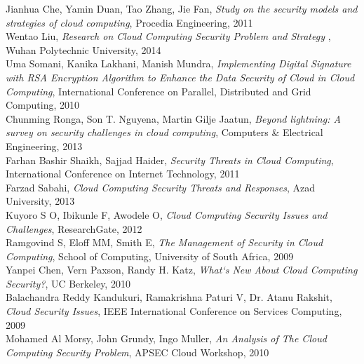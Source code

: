 \documentclass[a4paper, 8pt]{article} %
\begin{document}
\begin{itemize}
\end{itemize}

\newpage

\begin{thebibliography}{1}
Jianhua Che, Yamin Duan, Tao Zhang, Jie Fan, \emph{Study on the security models and strategies of cloud computing}, \relax Procedia Engineering, 2011\\
Wentao Liu, \emph{Research on Cloud Computing Security Problem and Strategy }, \relax Wuhan Polytechnic University, 2014\\
Uma Somani, Kanika Lakhani, Manish Mundra, \emph{Implementing Digital Signature with RSA Encryption Algorithm to Enhance the Data Security of Cloud in Cloud Computing}, \relax International Conference on Parallel, Distributed and Grid Computing, 2010\\
Chunming Ronga, Son T. Nguyena, Martin Gilje Jaatun, \emph{Beyond lightning: A survey on security challenges in cloud computing}, \relax Computers \& Electrical Engineering, 2013\\
Farhan Bashir Shaikh, Sajjad Haider, \emph{Security Threats in Cloud Computing}, \relax International Conference on Internet Technology, 2011\\
Farzad Sabahi, \emph{Cloud Computing Security Threats and Responses}, \relax Azad University, 2013\\
Kuyoro S O, Ibikunle F, Awodele O, \emph{Cloud Computing Security Issues and Challenges}, \relax ResearchGate, 2012\\
Ramgovind S, Eloff MM, Smith E, \emph{The Management of Security in Cloud Computing}, \relax School of Computing, University of South Africa, 2009\\
Yanpei Chen, Vern Paxson, Randy H. Katz, \emph{What`s New About Cloud Computing Security?}, \relax UC Berkeley, 2010\\
Balachandra Reddy Kandukuri, Ramakrishna Paturi V, Dr. Atanu Rakshit, \emph{Cloud Security Issues}, \relax IEEE International Conference on Services Computing, 2009\\
Mohamed Al Morsy, John Grundy, Ingo Muller, \emph{An Analysis of The Cloud Computing Security Problem}, \relax APSEC Cloud Workshop, 2010\\

\end{thebibliography}
\end{document}
